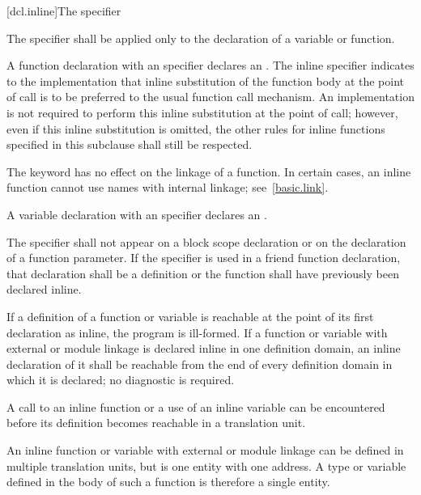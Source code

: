 [dcl.inline]{The  specifier}%

\pnum
The  specifier shall be applied only to the declaration
of a variable or function.

\pnum
{}%
%
A function declaration
with an  specifier declares an
. The inline specifier indicates to
the implementation that inline substitution of the function body at the
point of call is to be preferred to the usual function call mechanism.
An implementation is not required to perform this inline substitution at
the point of call; however, even if this inline substitution is omitted,
the other rules for inline functions specified in this subclause shall
still be respected.
\begin{note}
The  keyword has no effect on the linkage of a function.
In certain cases, an inline function cannot use names with internal linkage;
see~\ref{basic.link}.
\end{note}

\pnum
A variable declaration with an  specifier declares an
.

\pnum
The  specifier shall not appear on a block scope declaration or
on the declaration of a function parameter.
If the  specifier is used in a friend function declaration, that
declaration shall be a definition or the function shall have previously
been declared inline.

\pnum
If a definition of a function or variable is reachable
at the point of its
first declaration as inline, the program is ill-formed. If a function or variable
with external or module linkage
is declared inline in one definition domain,
an inline declaration of it shall be reachable
from the end of every definition domain in which it is declared;
no diagnostic is required.
\begin{note}
A call to an inline function or a use of an inline variable can be encountered
before its definition becomes reachable in a translation unit.
\end{note}

\pnum
\begin{note}
An inline function or variable
with external or module linkage
can be defined in multiple translation units,
but is one entity with one address.
A type or  variable
defined in the body of such a function
is therefore a single entity.
\end{note}

